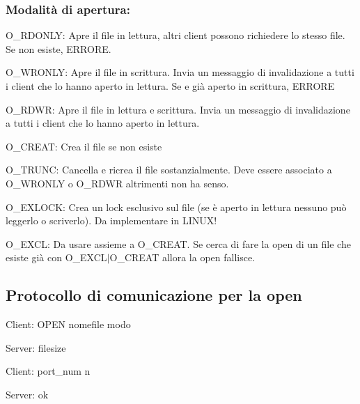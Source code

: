 \subsubsection*{Modalità di apertura\+:}


\begin{DoxyItemize}
\item O\+\_\+\+R\+D\+O\+N\+LY\+: Apre il file in lettura, altri client possono richiedere lo stesso file. Se non esiste, E\+R\+R\+O\+RE.
\item O\+\_\+\+W\+R\+O\+N\+LY\+: Apre il file in scrittura. Invia un messaggio di invalidazione a tutti i client che lo hanno aperto in lettura. Se e\textquotesingle{} già aperto in scrittura, E\+R\+R\+O\+RE
\item O\+\_\+\+R\+D\+WR\+: Apre il file in lettura e scrittura. Invia un messaggio di invalidazione a tutti i client che lo hanno aperto in lettura.
\item O\+\_\+\+C\+R\+E\+AT\+: Crea il file se non esiste
\item O\+\_\+\+T\+R\+U\+NC\+: Cancella e ricrea il file sostanzialmente. Deve essere associato a O\+\_\+\+W\+R\+O\+N\+LY o O\+\_\+\+R\+D\+WR altrimenti non ha senso.
\item O\+\_\+\+E\+X\+L\+O\+CK\+: Crea un lock esclusivo sul file (se è aperto in lettura nessuno può leggerlo o scriverlo). Da implementare in L\+I\+N\+U\+X!
\item O\+\_\+\+E\+X\+CL\+: Da usare assieme a O\+\_\+\+C\+R\+E\+AT. Se cerca di fare la open di un file che esiste già con O\+\_\+\+E\+X\+C\+L$\vert$\+O\+\_\+\+C\+R\+E\+AT allora la open fallisce. 

 \subsection*{Protocollo di comunicazione per la open}
\end{DoxyItemize}


\begin{DoxyEnumerate}
\item Client\+: O\+P\+EN nomefile modo
\item Server\+: filesize
\item Client\+: port\+\_\+num n
\item Server\+: ok
\end{DoxyEnumerate}

